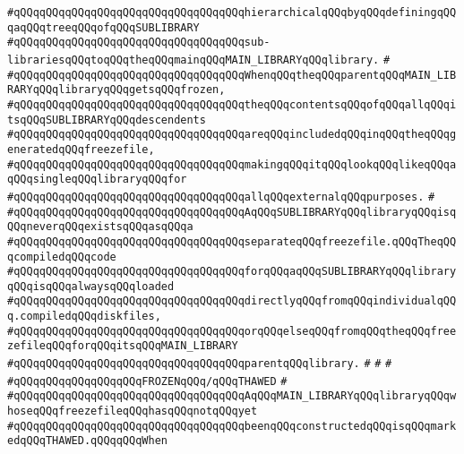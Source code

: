 \verb|#qQQqqQQqqQQqqQQqqQQqqQQqqQQqqQQqqQQqhierarchicalqQQqbyqQQqdefiningqQQqaqQQqtreeqQQqofqQQqSUBLIBRARY|\newline
\verb|#qQQqqQQqqQQqqQQqqQQqqQQqqQQqqQQqqQQqsub-librariesqQQqtoqQQqtheqQQqmainqQQqMAIN_LIBRARYqQQqlibrary.|\newline
\verb|#|\newline
\verb|#qQQqqQQqqQQqqQQqqQQqqQQqqQQqqQQqqQQqWhenqQQqtheqQQqparentqQQqMAIN_LIBRARYqQQqlibraryqQQqgetsqQQqfrozen,|\newline
\verb|#qQQqqQQqqQQqqQQqqQQqqQQqqQQqqQQqqQQqtheqQQqcontentsqQQqofqQQqallqQQqitsqQQqSUBLIBRARYqQQqdescendents|\newline
\verb|#qQQqqQQqqQQqqQQqqQQqqQQqqQQqqQQqqQQqareqQQqincludedqQQqinqQQqtheqQQqgeneratedqQQqfreezefile,|\newline
\verb|#qQQqqQQqqQQqqQQqqQQqqQQqqQQqqQQqqQQqmakingqQQqitqQQqlookqQQqlikeqQQqaqQQqsingleqQQqlibraryqQQqfor|\newline
\verb|#qQQqqQQqqQQqqQQqqQQqqQQqqQQqqQQqqQQqallqQQqexternalqQQqpurposes.|\newline
\verb|#|\newline
\verb|#qQQqqQQqqQQqqQQqqQQqqQQqqQQqqQQqqQQqAqQQqSUBLIBRARYqQQqlibraryqQQqisqQQqneverqQQqexistsqQQqasqQQqa|\newline
\verb|#qQQqqQQqqQQqqQQqqQQqqQQqqQQqqQQqqQQqseparateqQQqfreezefile.qQQqTheqQQqcompiledqQQqcode|\newline
\verb|#qQQqqQQqqQQqqQQqqQQqqQQqqQQqqQQqqQQqforqQQqaqQQqSUBLIBRARYqQQqlibraryqQQqisqQQqalwaysqQQqloaded|\newline
\verb|#qQQqqQQqqQQqqQQqqQQqqQQqqQQqqQQqqQQqdirectlyqQQqfromqQQqindividualqQQq.compiledqQQqdiskfiles,|\newline
\verb|#qQQqqQQqqQQqqQQqqQQqqQQqqQQqqQQqqQQqorqQQqelseqQQqfromqQQqtheqQQqfreezefileqQQqforqQQqitsqQQqMAIN_LIBRARY|\newline
\verb|#qQQqqQQqqQQqqQQqqQQqqQQqqQQqqQQqqQQqparentqQQqlibrary.|\newline
\verb|#|\newline
\verb|#|\newline
\verb|#|\newline
\verb|#qQQqqQQqqQQqqQQqqQQqFROZENqQQq/qQQqTHAWED|\newline
\verb|#|\newline
\verb|#qQQqqQQqqQQqqQQqqQQqqQQqqQQqqQQqqQQqAqQQqMAIN_LIBRARYqQQqlibraryqQQqwhoseqQQqfreezefileqQQqhasqQQqnotqQQqyet|\newline
\verb|#qQQqqQQqqQQqqQQqqQQqqQQqqQQqqQQqqQQqbeenqQQqconstructedqQQqisqQQqmarkedqQQqTHAWED.qQQqqQQqWhen|\newline
